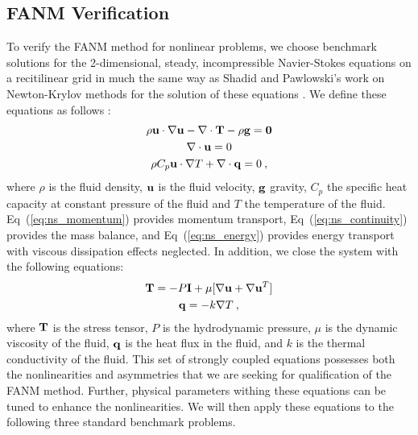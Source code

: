 \subsection{FANM Verification}
\label{subsec:fanm_verification}
To verify the FANM method for nonlinear problems, we choose benchmark
solutions for the 2-dimensional, steady, incompressible Navier-Stokes
equations on a recitilinear grid in much the same way as Shadid and
Pawlowski's work on Newton-Krylov methods for the solution of these
equations \citep{shadid_inexact_1997,pawlowski_globalization_2006}. We
define these equations as follows :
\begin{subequations}
  \begin{gather}
    \rho \mathbf{u} \cdot \nabla \mathbf{u} - \nabla \cdot \mathbf{T} - \rho
    \mathbf{g} = \mathbf{0}
    \label{eq:ns_momentum}\\
    \nabla \cdot \mathbf{u} = 0
    \label{eq:ns_continuity}\\
    \rho C_p \mathbf{u} \cdot \nabla T + \nabla \cdot \mathbf{q} = 0\:,
    \label{eq:ns_energy}
  \end{gather}
  \label{eq:navier_stokes}
\end{subequations}
where $\rho$ is the fluid density, $\mathbf{u}$ is the fluid velocity,
$\mathbf{g}$ gravity, $C_p$ the specific heat capacity at constant
pressure of the fluid and $T$ the temperature of the
fluid. Eq~(\ref{eq:ns_momentum}) provides momentum transport,
Eq~(\ref{eq:ns_continuity}) provides the mass balance, and
Eq~(\ref{eq:ns_energy}) provides energy transport with viscous
dissipation effects neglected. In addition, we close the system with
the following equations:
\begin{subequations}
  \begin{gather}
    \mathbf{T} = -P \mathbf{I} + \mu[\nabla \mathbf{u} + \nabla \mathbf{u}^T]
    \label{eq:ns_stress_tensor}\\
    \mathbf{q} = - k \nabla T\:,
    \label{eq:ns_heat_flux}
  \end{gather}
  \label{eq:ns_closure}
\end{subequations}
where $\mathbf{T}$ is the stress tensor, $P$ is the hydrodynamic pressure,
$\mu$ is the dynamic viscosity of the fluid, $\mathbf{q}$ is the heat flux
in the fluid, and $k$ is the thermal conductivity of the fluid. This
set of strongly coupled equations possesses both the nonlinearities
and asymmetries that we are seeking for qualification of the FANM
method. Further, physical parameters withing these equations can be
tuned to enhance the nonlinearities. We will then apply these
equations to the following three standard benchmark problems.


